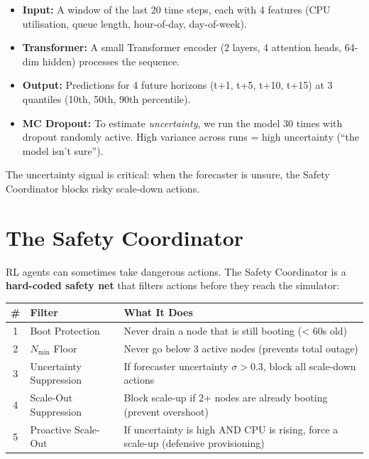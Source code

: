 \documentclass[11pt,a4paper]{article}
\begin{document}
\begin{itemize}[leftmargin=2em]
  \item \textbf{Input:} A window of the last 20 time steps, each with 4
        features (CPU utilisation, queue length, hour-of-day, day-of-week).
  \item \textbf{Transformer:} A small Transformer encoder (2 layers, 4 attention
        heads, 64-dim hidden) processes the sequence.
  \item \textbf{Output:} Predictions for 4 future horizons (t+1, t+5, t+10,
        t+15) at 3 quantiles (10th, 50th, 90th percentile).
  \item \textbf{MC Dropout:} To estimate \textit{uncertainty}, we run the model
        30 times with dropout randomly active. High variance across runs =
        high uncertainty (``the model isn't sure'').
\end{itemize}

The uncertainty signal is critical: when the forecaster is unsure, the Safety
Coordinator blocks risky scale-down actions.


\section{The Safety Coordinator}\label{sec:coordinator}


RL agents can sometimes take dangerous actions. The Safety Coordinator is a
\textbf{hard-coded safety net} that filters actions before they reach the
simulator:

\begin{center}
\begin{tabular}{clp{7cm}}
\toprule
\textbf{\#} & \textbf{Filter} & \textbf{What It Does} \\
\midrule
1 & Boot Protection & Never drain a node that is still booting (< 60s old) \\
2 & $N_{\min}$ Floor & Never go below 3 active nodes (prevents total outage) \\
3 & Uncertainty Suppression & If forecaster uncertainty $\sigma > 0.3$, block all
    scale-down actions \\
4 & Scale-Out Suppression & Block scale-up if 2+ nodes are already booting
    (prevent overshoot) \\
5 & Proactive Scale-Out & If uncertainty is high AND CPU is rising, force a
    scale-up (defensive provisioning) \\
\bottomrule
\end{tabular}
\end{center}
\end{document}
